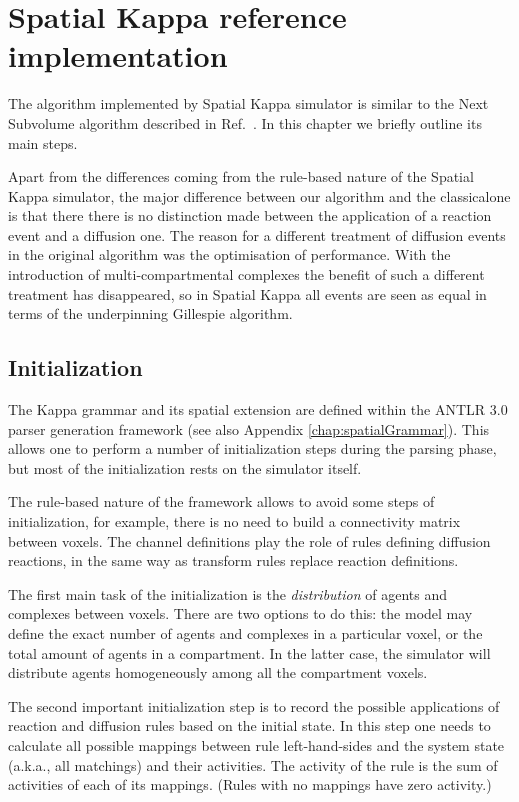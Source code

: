 \documentclass[english]{report}
\begin{document}
%

\chapter{Spatial Kappa reference implementation}

The algorithm implemented by Spatial Kappa simulator is similar to the Next Subvolume algorithm described in Ref.~\citep{Elf:2004fv}. In this chapter we briefly outline its main steps.

Apart from the differences coming from the rule-based nature of the Spatial Kappa simulator, the major difference between our algorithm and the classicalone  is that there there is no distinction made between the application of a reaction event and a diffusion one. The reason for a different treatment of diffusion events in the original algorithm was the optimisation of performance. 
With the introduction of multi-compartmental complexes the benefit of such a different treatment has disappeared, so in Spatial Kappa all events are seen as equal in terms of the underpinning Gillespie algorithm. 

\section{Initialization}
The Kappa grammar and its spatial extension are defined within the ANTLR 3.0 parser generation framework (see also Appendix \ref{chap:spatialGrammar}). This allows one to perform a number of initialization steps during the parsing phase, but most of the initialization rests on the simulator itself.

The rule-based nature of the framework allows to avoid some steps of initialization, for example, there is no need to build a connectivity matrix between voxels. The channel definitions play the role of rules defining diffusion reactions, 
in the same way as transform rules replace reaction definitions.

The first main task of the initialization is the \emph{distribution} of agents and complexes between voxels. There are two options to do this: the model may define the exact number of agents and complexes in a particular voxel, or the total amount of agents in a compartment. In the latter case, the simulator will distribute agents homogeneously among all the compartment voxels.

The second important initialization step is to record the possible applications of reaction and diffusion rules based on the initial state. In this step one needs to calculate all possible mappings between rule left-hand-sides and the system state (a.k.a., all matchings) and their activities. The activity of the rule is the sum of activities of each of its mappings. (Rules with no mappings have zero activity.)
\end{document}

